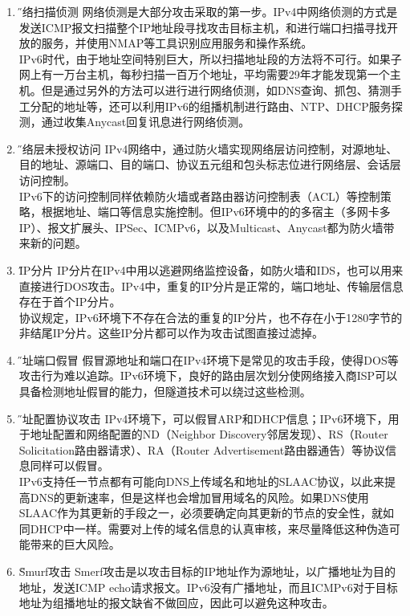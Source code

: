 \documentclass[a4paper,14pt,openany]{article}
\begin{document}
\begin{enumerate}   %
\item{\H 网络扫描侦测}  %
网络侦测是大部分攻击采取的第一步。IPv4中网络侦测的方式是发送ICMP报文扫描整个IP地址段寻找攻击目标主机，和进行端口扫描寻找开放的服务，并使用NMAP等工具识别应用服务和操作系统。
\\
IPv6时代，由于地址空间特别巨大，所以扫描地址段的方法将不可行。如果子网上有一万台主机，每秒扫描一百万个地址，平均需要29年才能发现第一个主机。但是通过另外的方法可以进行进行网络侦测，如DNS查询、抓包、猜测手工分配的地址等，还可以利用IPv6的组播机制进行路由、NTP、DHCP服务探测，通过收集Anycast回复讯息进行网络侦测。

\item{\H 网络层未授权访问}
IPv4网络中，通过防火墙实现网络层访问控制，对源地址、目的地址、源端口、目的端口、协议五元组和包头标志位进行网络层、会话层访问控制。
\\
IPv6下的访问控制同样依赖防火墙或者路由器访问控制表（ACL）等控制策略，根据地址、端口等信息实施控制。但IPv6环境中的的多宿主（多网卡多IP）、报文扩展头、IPSec、ICMPv6，以及Multicast、Anycast都为防火墙带来新的问题。

\item{\H IP分片}
IP分片在IPv4中用以逃避网络监控设备，如防火墙和IDS，也可以用来直接进行DOS攻击。IPv4中，重复的IP分片是正常的，端口地址、传输层信息存在于首个IP分片。
\\
协议规定，IPv6环境下不存在合法的重复的IP分片，也不存在小于1280字节的非结尾IP分片。这些IP分片都可以作为攻击试图直接过滤掉。

\item{\H 地址端口假冒}
假冒源地址和端口在IPv4环境下是常见的攻击手段，使得DOS等攻击行为难以追踪。IPv6环境下，良好的路由层次划分使网络接入商ISP可以具备检测地址假冒的能力，但隧道技术可以绕过这些检测。

\item{\H 地址配置协议攻击}
IPv4环境下，可以假冒ARP和DHCP信息；IPv6环境下，用于地址配置和网络配置的ND（Neighbor Discovery邻居发现）、RS（Router Solicitation路由器请求）、RA（Router Advertisement路由器通告）等协议信息同样可以假冒。
\\
IPv6支持任一节点都有可能向DNS上传域名和地址的SLAAC协议，以此来提高DNS的更新速率，但是这样也会增加冒用域名的风险。如果DNS使用SLAAC作为其更新的手段之一，必须要确定向其更新的节点的安全性，就如同DHCP中一样。需要对上传的域名信息的认真审核，来尽量降低这种伪造可能带来的巨大风险。

\item{\H Smurf攻击}
Smerf攻击是以攻击目标的IP地址作为源地址，以广播地址为目的地址，发送ICMP echo请求报文。IPv6没有广播地址，而且ICMPv6对于目标地址为组播地址的报文缺省不做回应，因此可以避免这种攻击。


\end{enumerate}
\end{document}
